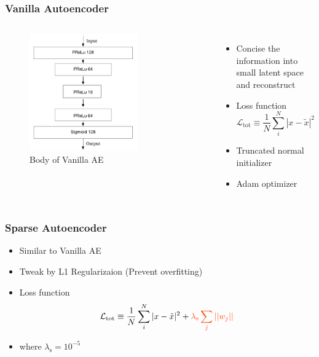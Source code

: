 \documentclass{beamer}
\begin{document}
\begin{frame}
\frametitle{Vanilla Autoencoder}
\begin{columns}
    \begin{figure}
        \includegraphics[height=0.6\textheight, width=0.7\textwidth]{images/vanilla_ae}
        \caption{Body of Vanilla AE}
    \end{figure}

    \begin{itemize}
    \item Concise the information into small latent space and reconstruct
    \item Loss function
    \begin{equation}
        \mathcal{L}_{\text{tot}} \equiv \frac{1}{N}\sum_i^N |x-\tilde{x}|^2
    \end{equation}
    \item Truncated normal initializer
    \item Adam optimizer
    \end{itemize}
\end{columns}
\end{frame}
\begin{frame}
\frametitle{Sparse Autoencoder}
\begin{itemize}
    \item Similar to Vanilla AE
    \item Tweak by \textcolor[RGB]{255,69,0}{L1 Regularizaion (Prevent overfitting)}
    \item Loss function
    \begin{equation}
        \mathcal{L}_{\text{tot}} \equiv \frac{1}{N}\sum_i^N |x-\tilde{x}|^2 + \textcolor[RGB]{255,69,0}{\lambda_{\text{s}}\sum_j||w_j||}
    \end{equation}
    \item where $\lambda_{\text{s}} = 10^{-5}$
\end{itemize}

\end{frame}
\end{document}
